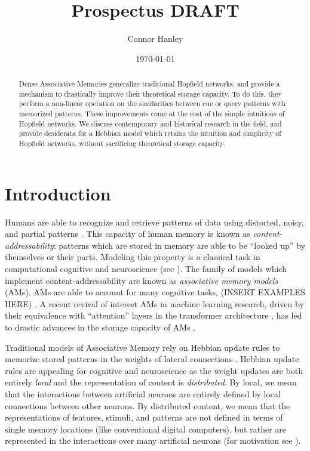 \documentclass{article}
\title{Prospectus DRAFT}
\author{Connor Hanley}
\date{\today}
\theoremstyle{definition}
\begin{document}
\maketitle

\begin{abstract}
  Dense Associative Memories generalize traditional Hopfield networks, and
  provide a mechanism to drastically improve their theoretical storage
  capacity. To do this, they perform a non-linear operation on the
  similarities between cue or query patterns with memorized patterns. These
  improvements come at the cost of the simple intuitions of Hopfield networks.
  We discuss contemporary and historical research in the field, and provide
  desiderata for a Hebbian model which retains the intuition and
  simplicity of Hopfield networks, without sacrificing theoretical storage
  capacity.
\end{abstract}

\section{Introduction}

Humans are able to recognize and retrieve patterns of data using distorted,
noisy, and partial patterns \parencite{rumelhart_general_1986}. This
capacity of human memory is known as \textit{content-addressability}: patterns
which are stored in memory are able to be ``looked up'' by themselves or their
parts. Modeling this property is a classical task in computational cognitive
and neuroscience (see \textcites{marr_simple_1971,little_existence_1974,
amari_learning_1972,nakano_associatron-model_1972,stanley_simulation_1976}).
The family of models which implement content-addressability are known
as \textit{associative memory models} (AMs). AMs are able to account for many
cognitive tasks, (INSERT EXAMPLES HERE) \parencite{hintzman_minerva_1984}.
A recent revival of interest AMs in machine learning research,
driven by their equivalence with ``attention'' layers in the transformer
architecture \parencites{vaswani_attention_2023, ramsauer_hopfield_2021},
has led to drastic advances in the storage capacity of AMs
\parencites{demircigil_model_2017,krotov_dense_2016,hu_provably_2024}.

Traditional models of Associative Memory rely on Hebbian update rules
to memorize stored patterns in the weights of lateral connections
\parencites{amari_learning_1972,hopfield_neural_1982,kohonen_correlation_1988,
nakano_associatron-model_1972}. Hebbian update rules are appealing
for cognitive
and neuroscience as the weight updates are both entirely \textit{local} and
the representation of content is \textit{distributed}. By local, we mean
that the interactions between artificial neurons are entirely defined by
local connections between other neurons. By distributed content, we mean that
the representations of features, stimuli, and patterns are not defined in terms
of single memory locations (like conventional digital computers), but rather
are represented in the interactions over many artificial neurons (for motivation
see \textcite{mcclelland_appeal_1986}).
\end{document}
